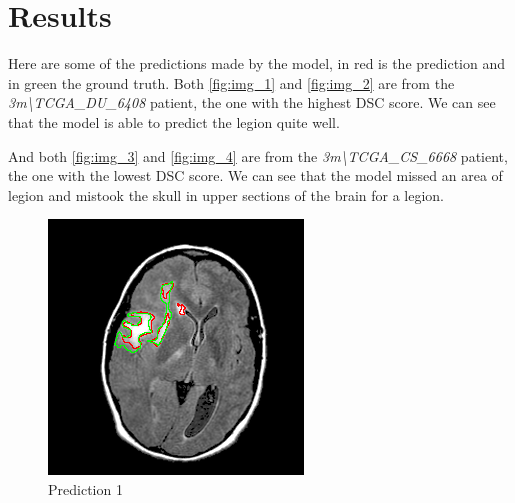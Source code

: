 \documentclass[11pt,a4paper]{article}
\begin{document}
\section{Results}
Here are some of the predictions made by the model, in red is the prediction and in green the ground truth. Both \autoref{fig:img_1} and \autoref{fig:img_2} are from the \textit{3m\textbackslash TCGA\_DU\_6408} patient, the one with the highest DSC score. We can see that the model is able to predict the legion quite well.

And both \autoref{fig:img_3} and \autoref{fig:img_4} are from the \textit{3m\textbackslash TCGA\_CS\_6668} patient, the one with the lowest DSC score. We can see that the model missed an area of legion and mistook the skull in upper sections of the brain for a legion.

\begin{figure}[H]
    \centering
    \begin{minipage}[t]{0.48\textwidth}
        \centering
        \includegraphics[width=\linewidth]{../predictions/kaggle_3m/TCGA_DU_6408_19860521-22.png}
        \caption{Prediction 1}
        \label{fig:img_1}
    \end{minipage}
    \hfill
    \begin{minipage}[t]{0.48\textwidth}
        \centering

\end{minipage}
\end{figure}
\end{document}
